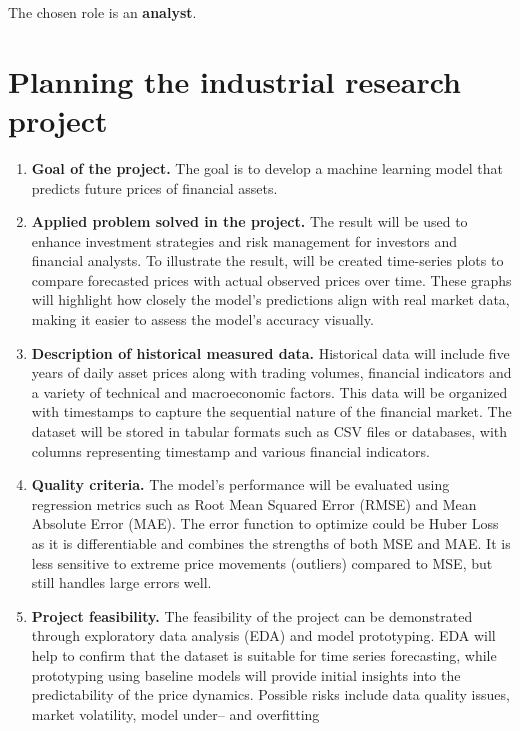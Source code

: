 \documentclass[12pt]{article}
\date{}
\begin{document}
\maketitle

The chosen role is an \textbf{analyst}.

\section{Planning the industrial research project}

\begin{enumerate}
\item \textbf{Goal of the project.} The goal is to develop a machine learning model that predicts future prices of financial assets.
\item \textbf{Applied problem solved in the project.} The result will be used to enhance investment strategies and risk management
for investors and financial analysts. To illustrate the result, will be created time-series plots to compare forecasted prices with actual
observed prices over time. These graphs will highlight how closely the model's predictions align with real market data, making it easier to
assess the model's accuracy visually.
\item \textbf{Description of historical measured data.} Historical data will include five years of daily asset prices along with trading volumes,
financial indicators and a variety of technical and macroeconomic factors. This data will be organized with timestamps to capture the sequential
nature of the financial market. The dataset will be stored in tabular formats such as CSV files or databases, with columns representing timestamp
and various financial indicators.
\item \textbf{Quality criteria.} The model's performance will be evaluated using regression metrics such as Root Mean Squared Error (RMSE) and
Mean Absolute Error (MAE). The error function to optimize could be Huber Loss as it is differentiable and combines the strengths of both MSE and MAE.
It is less sensitive to extreme price movements (outliers) compared to MSE, but still handles large errors well.
\item \textbf{Project feasibility.} The feasibility of the project can be demonstrated through exploratory data analysis (EDA) and model prototyping.
EDA will help to confirm that the dataset is suitable for time series forecasting, while prototyping using baseline models will provide initial
insights into the predictability of the price dynamics. Possible risks include data quality issues, market volatility, model under– and overfitting

\end{enumerate}
\end{document}
